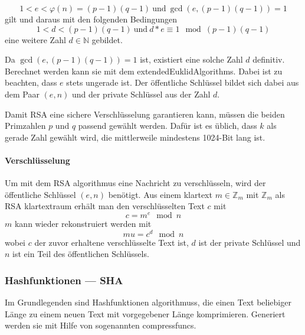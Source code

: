 \begin{equation}
    1 < e < \varphi(n) = (p - 1)(q - 1)\ \text{und}\ \gcd(e, (p-1)(q-1)) = 1\label{eq:equation2}
\end{equation}
gilt und daraus mit den folgenden Bedingungen
\begin{equation}
    1 < d < (p-1)(q-1)\ \text{und}\ d*e \equiv 1\mod(p-1)(q-1)\label{eq:equation3}
\end{equation}
eine weitere Zahl \(d \in \mathbb{N}\) gebildet.

Da $\gcd(e, (p-1)(q-1)) = 1$ ist, existiert eine solche Zahl $d$ definitiv.
Berechnet werden kann sie mit dem \glspl{extendedEuklidAlgorithm}.
Dabei ist zu beachten, dass $e$ stets ungerade ist.
Der öffentliche Schlüssel bildet sich dabei aus dem Paar $(e, n)$ und der private Schlüssel aus der Zahl $d$.\autocite[\pagef~169]{buchmann_einfuhrung_2016}

Damit \ac{RSA} eine sichere Verschlüsselung garantieren kann, müssen die beiden Primzahlen $p$ und $q$ passend gewählt werden.
Dafür ist es üblich, dass $k$ als gerade Zahl gewählt wird, die mittlerweile mindestens 1024-Bit lang ist.\autocite[\pagef~169]{buchmann_einfuhrung_2016}

\paragraph{Verschlüsselung}\label{par:verschluesselung}
Um mit dem \ac{RSA} \gls{algorithmus} eine Nachricht zu verschlüsseln, wird der öffentliche Schlüssel $(e, n)$ benötigt.
Aus einem \gls{klartext} \(m \in \mathbb{Z}_m\) mit \(\mathbb{Z}_m\) als \ac{RSA} \gls{klartextraum} erhält man den verschlüsselten Text $c$ mit
\begin{equation}
    c = m^e\mod n\label{eq:equation4}
\end{equation}
$m$ kann wieder rekonstruiert werden mit
\begin{equation}
    mu = c^d \mod n\label{eq:equation5}
\end{equation}
wobei $c$ der zuvor erhaltene verschlüsselte Text ist, $d$ ist der private Schlüssel und $n$ ist ein Teil des öffentlichen Schlüssels.\autocite[\pagef~6]{rsa-encryption}

\subsubsection[Hashfunktionen]{Hashfunktionen — \acf{SHA}}\label{subsubsec:hash-funktion}
Im Grundlegenden sind Hashfunktionen \glspl{algorithmus}, die einen Text beliebiger Länge zu einem neuen Text mit vorgegebener Länge komprimieren\autocite[\pagef~15]{anal_des_hash_function_2003}.
Generiert werden sie mit Hilfe von sogenannten \glspl{compressfunc}.

